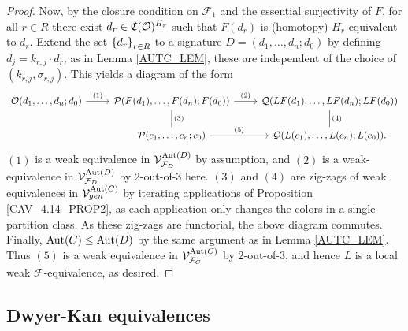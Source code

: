 \documentclass[a4paper,10pt
,draft
]{article}%
\renewcommand{\F}{\mathcal F}
\newcommand{\Q}{\mathcal Q}
\renewcommand{\1}{\eta}%
\begin{document}
\begin{proof}
      Now, by the {\color{red} closure condition on} $\F_1$ and the essential surjectivity of $F$,
      for all $r \in R$ there exist $d_r \in \mathfrak C(\mathcal{O})^{H_r}$ such that
      $F(d_r)$ is (homotopy) $H_r$-equivalent to $d_r$.
      Extend the set $\left\{d_r\right\}_{r\in R}$ to a signature $D = (d_1,\ldots, d_n;d_0)$
      by defining $d_j = k_{r,j} \cdot d_r$;
      as in Lemma \ref{AUTC_LEM}, these are independent of the choice of $(k_{r,j}, \sigma_{r,j})$.
      This yields a diagram of the form
      \begin{equation}
            \label{TWOOFTHREE_EQ}
            \begin{tikzcd}
                  \O(d_1,\ldots, d_n;d_0) \arrow[r, "(1)"]
                  &
                  \P(F(d_1),\ldots, F(d_n); F(d_0)) \arrow[d,dash, "(3)"] \arrow[r, "(2)"]
                  &
                  \Q(LF(d_1),\ldots, LF(d_n);LF(d_0)) \arrow[d, dash, "(4)"]
                  \\
                  &
                  \P(c_1,\ldots, c_n;c_0) \arrow[r, "(5)"]
                  &
                  \Q(L(c_1),\ldots, L(c_n); L(c_0)).
            \end{tikzcd}
      \end{equation}
      $(1)$ is a weak equivalence in $\V^{\Aut(D)}_{\F_D}$ by assumption, and
      $(2)$ is a weak-equivalence in $\V^{\Aut(D)}_{\F_D}$ by 2-out-of-3 here.
      $(3)$ and $(4)$ are zig-zags of weak equivalences in $\mathcal V^{\operatorname{Aut}(C)}_{gen}$ by iterating applications of
      Proposition \ref{CAV_4.14_PROP2},
      as each application only changes the colors in a single partition class.
      As these zig-zags are functorial, the above diagram commutes.
      Finally, $\operatorname{Aut}(C) \leq \operatorname{Aut}(D)$ by the same argument as in Lemma \ref{AUTC_LEM}.
      Thus $(5)$ is a weak equivalence in $\V^{\Aut(C)}_{\F_C}$ by 2-out-of-3, and hence
      $L$ is a local weak $\F$-equivalence, as desired.
\end{proof}








\subsection{Dwyer-Kan equivalences}
\label{DK_SEC}
\end{document}
